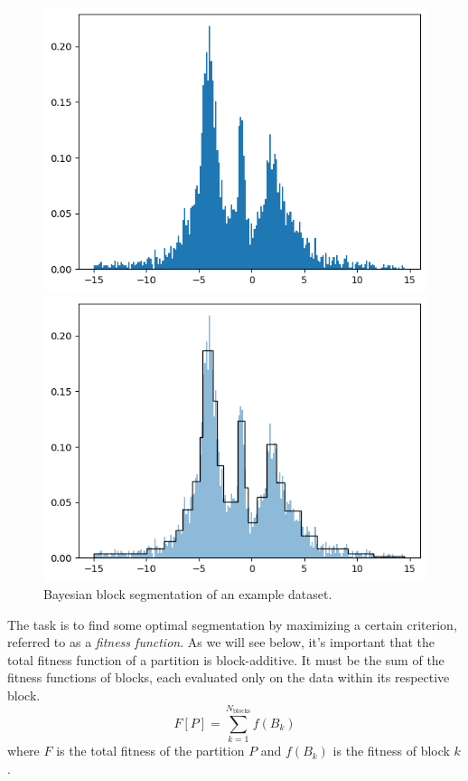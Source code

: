 \documentclass{article}
\begin{document}
\begin{figure}[h]
    \centering
    \begin{minipage}[b]{0.45\textwidth}
        \includegraphics[width=\textwidth]{image1.png}
    \end{minipage}
    \hfill
    \begin{minipage}[b]{0.45\textwidth}
        \includegraphics[width=\textwidth]{image2.png}
    \end{minipage}
    \caption{Bayesian block segmentation of an example dataset.}
    \label{fig:both_images}
\end{figure}

The task is to find some optimal segmentation by maximizing a certain criterion, referred to as a \textit{fitness function}. As we will see below, it's important that the total fitness function of a partition is block-additive. It must be the sum of the fitness functions of blocks, each evaluated only on the data within its respective block.
\begin{equation}
F[P]=\sum\limits_{k=1}^{N_{\text{blocks}}}f(B_k)
\end{equation}
where $F$ is the total fitness of the partition $P$ and $f(B_k)$ is the fitness of block $k$.
\end{document}
